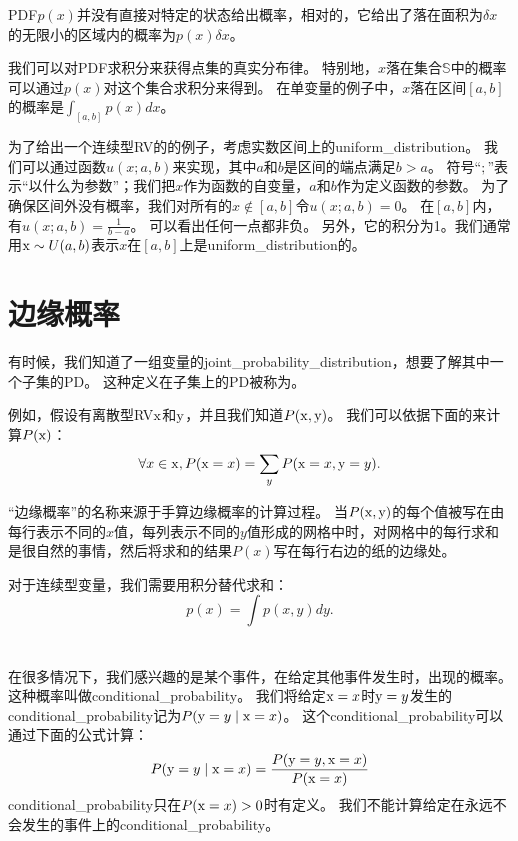 \gls{PDF}$p(x)$并没有直接对特定的状态给出概率，相对的，它给出了落在面积为$\delta x$ 的无限小的区域内的概率为$p(x)\delta x$。

我们可以对\gls{PDF}求积分来获得点集的真实分布律。
特别地，$x$落在集合$\mathbb{S}$中的概率可以通过$p(x)$对这个集合求积分来得到。
在单变量的例子中，$x$落在区间$[a, b]$的概率是$\int_{[a,b]} p(x)dx$。

为了给出一个连续型\gls{RV}的的例子，考虑实数区间上的\gls{uniform_distribution}。
我们可以通过函数$u(x; a, b)$来实现，其中$a$和$b$是区间的端点满足$b>a$。
符号``$;$''表示``以什么为参数''；我们把$x$作为函数的自变量，$a$和$b$作为定义函数的参数。
为了确保区间外没有概率，我们对所有的$x\not\in[a,b]$令$u(x; a, b)=0$。
在$[a,b]$内，有$u(x; a, b)= \frac{1}{b-a}$。
可以看出任何一点都非负。
另外，它的积分为1。我们通常用$\mathrm{x} \sim U(a, b)$表示$x$在$[a, b]$上是\gls{uniform_distribution}的。

\section{边缘概率}
\label{sec:marginal_probability}

有时候，我们知道了一组变量的\gls{joint_probability_distribution}，想要了解其中一个子集的\gls{PD}。
这种定义在子集上的\gls{PD}被称为。

例如，假设有离散型\gls{RV}$\mathrm{x}$和$\mathrm{y}$，并且我们知道$P(\mathrm{x}, \mathrm{y})$。
我们可以依据下面的来计算$P(\mathrm{x})$：
\begin{equation}
\forall x \in \mathrm{x}, P(\mathrm{x} = x) = \sum_y P(\mathrm{x} = x, \mathrm{y} = y).
\end{equation}


``边缘概率''的名称来源于手算边缘概率的计算过程。
当$P(\mathrm{x}, \mathrm{y})$的每个值被写在由每行表示不同的$x$值，每列表示不同的$y$值形成的网格中时，对网格中的每行求和是很自然的事情，然后将求和的结果$P(x)$写在每行右边的纸的边缘处。

对于连续型变量，我们需要用积分替代求和：
\begin{equation}
p(x) = \int p(x, y)dy.
\end{equation}

\section{}
\label{sec:conditional_probability}

在很多情况下，我们感兴趣的是某个事件，在给定其他事件发生时，出现的概率。
这种概率叫做\gls{conditional_probability}。
我们将给定$\mathrm{x} = x$时$\mathrm{y} = y$发生的\gls{conditional_probability}记为$P(\mathrm{y} = y\mid \mathrm{x} =x)$。
这个\gls{conditional_probability}可以通过下面的公式计算：
\begin{equation}
P(\mathrm{y} = y\mid \mathrm{x} = x) = \frac{P(\mathrm{y} = y, \mathrm{x} = x)}{P(\mathrm{x} = x)}
\label{eq: 3.5}
\end{equation}
\gls{conditional_probability}只在$P(\mathrm{x} = x)>0$时有定义。
我们不能计算给定在永远不会发生的事件上的\gls{conditional_probability}。

